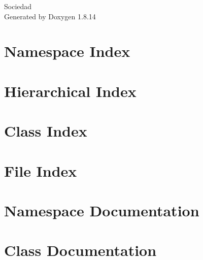 \documentclass[twoside]{book}
\newcommand{\+}{\discretionary{\mbox{\scriptsize$\hookleftarrow$}}{}{}}
\newcommand{\clearemptydoublepage}{%
  \newpage{\pagestyle{empty}\cleardoublepage}%
}
\begin{document}
\hypersetup{pageanchor=false,
             bookmarksnumbered=true,
             pdfencoding=unicode
            }
\begin{titlepage}
\vspace*{7cm}
\begin{center}%
{\Large Sociedad }\\
\vspace*{1cm}
{\large Generated by Doxygen 1.8.14}\\
\end{center}
\end{titlepage}
\clearemptydoublepage
{}
\tableofcontents
\clearemptydoublepage
{}
\hypersetup{pageanchor=true}

\chapter{Namespace Index}

\chapter{Hierarchical Index}

\chapter{Class Index}

\chapter{File Index}

\chapter{Namespace Documentation}

\chapter{Class Documentation}






















\end{document}
